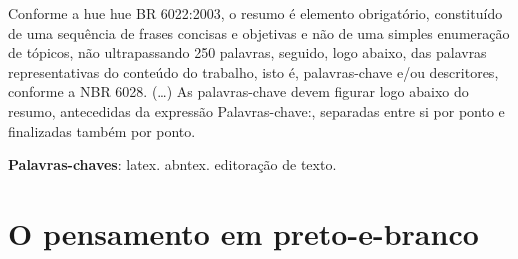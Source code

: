 \documentclass[
	article,			%
	12pt,				%
	oneside,			%
	a4paper,			%
	english,			%
	brazil,				%
	sumario=tradicional
	]{abntex2}
\begin{document}
\frenchspacing 


%
%
\maketitle

\begin{resumoumacoluna}
 Conforme a hue hue BR 6022:2003, o resumo é elemento obrigatório, constituído de
 uma sequência de frases concisas e objetivas e não de uma simples enumeração
 de tópicos, não ultrapassando 250 palavras, seguido, logo abaixo, das palavras
 representativas do conteúdo do trabalho, isto é, palavras-chave e/ou
 descritores, conforme a NBR 6028. (\ldots) As palavras-chave devem figurar logo
 abaixo do resumo, antecedidas da expressão Palavras-chave:, separadas entre si por
 ponto e finalizadas também por ponto.
 
 \vspace{\onelineskip}
 
 \noindent
 \textbf{Palavras-chaves}: latex. abntex. editoração de texto.
\end{resumoumacoluna}

\textual

\section*{O pensamento em preto-e-branco}
\end{document}
